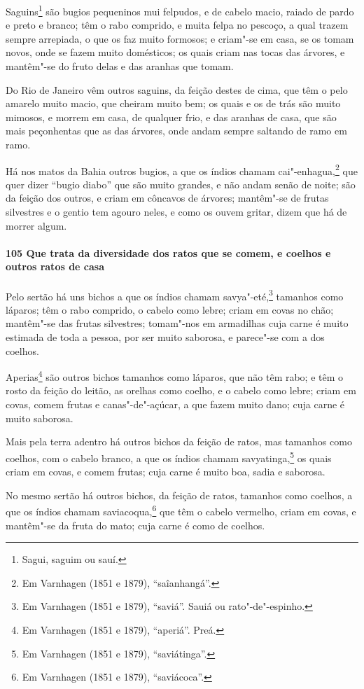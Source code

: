 \begin{linenumbers}
Saguins\footnote{ Sagui, saguim ou sauí.} são bugios pequeninos mui felpudos, e de cabelo
macio, raiado de pardo e preto e branco; têm o rabo comprido, e muita felpa no pescoço, a
qual trazem sempre arrepiada, o que os faz muito formosos; e criam"-se em casa, se os tomam
novos, onde se fazem muito domésticos; os quais criam nas tocas das árvores, e mantêm"-se
do fruto delas e das aranhas que tomam.

Do Rio de Janeiro vêm outros saguins, da feição destes de cima, que têm o pelo amarelo
muito macio, que cheiram muito bem; os quais e os de trás são muito mimosos, e morrem em
casa, de qualquer frio, e das aranhas de casa, que são mais peçonhentas que as das
árvores, onde andam sempre saltando de ramo em ramo.

Há nos matos da Bahia outros bugios, a que os índios chamam cai"-enhagua,\footnote{ Em
Varnhagen (1851 e 1879), ``saîanhangá''.} que quer dizer ``bugio diabo'' que são muito
grandes, e não andam senão de noite; são da feição dos outros, e criam em côncavos de
árvores; mantêm"-se de frutas silvestres e o gentio tem agouro neles, e como os ouvem
gritar, dizem que há de morrer algum.

\paragraph{105 Que trata da diversidade dos ratos que se comem, e coelhos e outros ratos
de casa}\quad
Pelo sertão há uns bichos a que os índios chamam savya"-eté,\footnote{ Em Varnhagen (1851 e
1879), ``saviá''. Sauiá ou rato"-de"-espinho.} tamanhos como láparos; têm o rabo comprido,
o cabelo como lebre; criam em covas no chão; mantêm"-se das frutas silvestres; tomam"-nos em
armadilhas cuja carne é muito estimada de toda a pessoa, por ser muito saborosa, e
parece"-se com a dos coelhos.

Aperias\footnote{ Em Varnhagen (1851 e 1879), ``aperiá''. Preá.} são outros bichos
tamanhos como láparos, que não têm rabo; e têm o rosto da feição do leitão, as orelhas
como coelho, e o cabelo como lebre; criam em covas, comem frutas e canas"-de"-açúcar, a que
fazem muito dano; cuja carne é muito saborosa.

Mais pela terra adentro há outros bichos da feição de ratos, mas tamanhos como coelhos,
com o cabelo branco, a que os índios chamam savyatinga,\footnote{ Em Varnhagen (1851 e
1879), ``saviátinga''.} os quais criam em covas, e comem frutas; cuja carne é muito boa,
sadia e saborosa.

No mesmo sertão há outros bichos, da feição de ratos, tamanhos como coelhos, a que os
índios chamam saviacoqua,\footnote{ Em Varnhagen (1851 e 1879), ``saviácoca''.} que têm o
cabelo vermelho, criam em covas, e mantêm"-se da fruta do mato; cuja carne é como de
coelhos.


\end{linenumbers}
